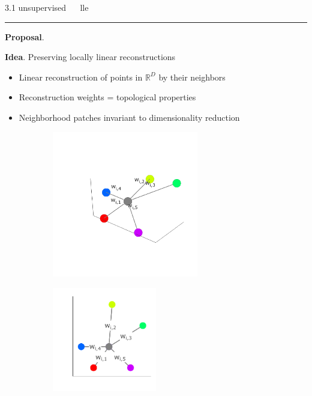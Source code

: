 \documentclass[11pt, compress, t, notes = noshow, xcolor = table, 
aspectratio = 1610]{beamer}
\newcommand{\highlight}[1]{\textcolor{highlightcol}{\textbf{#1}}}
\newcommand{\arritem}{\item[\highlight{$\rightarrow$}]}
\newcommand{\RD}{\mathbb{R}^D}
\begin{document}

\LARGE
\begin{frame}{\textcolor{gray!90}{3.1 unsupervised} ~~ lle}
\normalsize
\vspace{-0.5cm}
\noindent \textcolor{gray!90}{\rule{\textwidth}{1pt}}
\smallskip

\textbf{Proposal}. \citet{roweissaul2000}

\vspace{0.3cm}

\textbf{Idea}. Preserving locally linear reconstructions 

\begin{itemize}
  \arritem Linear reconstruction of points in $\RD$ by their neighbors
  \arritem Reconstruction weights = topological properties
  \arritem Neighborhood patches invariant to dimensionality reduction
\end{itemize}

\vspace{0.3cm}

\begin{figure}[H]
 \begin{subfigure}[b]{0.48\textwidth}
   \includegraphics[trim = 50 50 20 60, clip, %
   width = 0.7\textwidth]{figures/reconstruction-3d}
 \end{subfigure}
 \hfill
 \begin{subfigure}[b]{0.48\textwidth}
   \includegraphics[trim = 40 30 0 20, clip, %
   width = 0.5\textwidth]{figures/reconstruction-2d}
 \end{subfigure}
\end{figure}


\end{frame}
\end{document}
